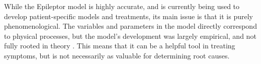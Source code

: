 While the Epileptor model is highly accurate, and is currently being used to develop patient-specific models and treatments, its main issue is that it is purely phenomenological.
The variables and parameters in the model directly correspond to physical processes, but the model's development was largely empirical, and not fully rooted in theory \cite{Jirsa2014}.
This means that it can be a helpful tool in treating symptoms, but is not necessarily as valuable for determining root causes.


